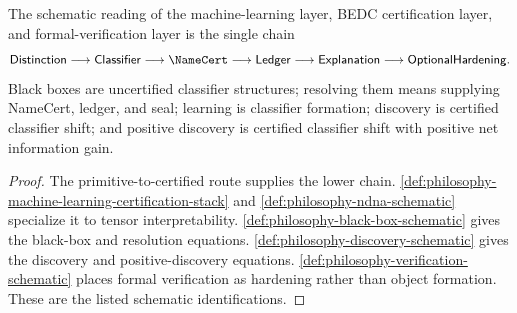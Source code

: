 \begin{theorem}
\label{thm:philosophy-unified-schematic-theorem}
The schematic reading of the machine-learning layer, BEDC certification
layer, and formal-verification layer is the single chain
$$
\mathsf{Distinction}
\longrightarrow
\mathsf{Classifier}
\longrightarrow
\NameCert
\longrightarrow
\mathsf{Ledger}
\longrightarrow
\mathsf{Explanation}
\longrightarrow
\mathsf{OptionalHardening}.
$$
Black boxes are uncertified classifier structures; resolving them means
supplying NameCert, ledger, and seal; learning is classifier formation;
discovery is certified classifier shift; and positive discovery is
certified classifier shift with positive net information gain.
\end{theorem}
\begin{proof}
The primitive-to-certified route supplies the lower chain.
\autoref{def:philosophy-machine-learning-certification-stack} and
\autoref{def:philosophy-ndna-schematic} specialize it to tensor
interpretability.
\autoref{def:philosophy-black-box-schematic} gives the black-box and
resolution equations.
\autoref{def:philosophy-discovery-schematic} gives the discovery and
positive-discovery equations.
\autoref{def:philosophy-verification-schematic} places formal
verification as hardening rather than object formation. These are the
listed schematic identifications.
\end{proof}
